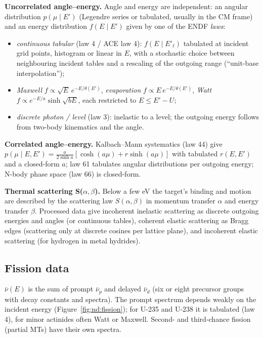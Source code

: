 \textbf{Uncorrelated angle--energy.} Angle and energy are independent: an angular distribution
$p(\mu\mid E')$ (Legendre series or tabulated, usually in the CM frame) and an energy distribution
$f(E\mid E')$ given by one of the ENDF \emph{laws}:
\begin{itemize}
\item \emph{continuous tabular} (law 4 / ACE law 4): $f(E\mid E'_\ell)$ tabulated at incident grid
  points, histogram or linear in $E$, with a stochastic choice between neighbouring incident tables and
  a rescaling of the outgoing range (``unit-base interpolation'');
\item \emph{Maxwell} $f\propto\sqrt E\,e^{-E/\theta(E')}$, \emph{evaporation}
  $f\propto E\,e^{-E/\theta(E')}$, \emph{Watt} $f\propto e^{-E/a}\sinh\sqrt{bE}$, each restricted to
  $E\le E'-U$;
\item \emph{discrete photon / level} (law 3): inelastic to a level; the outgoing energy follows from
  two-body kinematics and the angle.
\end{itemize}

\textbf{Correlated angle--energy.} Kalbach--Mann systematics (law 44) give
$p(\mu\mid E,E')=\frac{a}{2\sinh a}[\cosh(a\mu)+r\sinh(a\mu)]$ with tabulated $r(E,E')$ and a
closed-form $a$; law 61 tabulates angular distributions per outgoing energy; N-body phase space (law
66) is closed-form.

\textbf{Thermal scattering S($\alpha,\beta$).} Below a few eV the target's binding and motion are
described by the scattering law $S(\alpha,\beta)$ in momentum transfer $\alpha$ and energy transfer
$\beta$. Processed data give incoherent inelastic scattering as discrete outgoing energies and angles
(or continuous tables), coherent elastic scattering as Bragg edges (scattering only at discrete
cosines per lattice plane), and incoherent elastic scattering (for hydrogen in metal hydrides).

\subsection{Fission data}

$\bar\nu(E)$ is the sum of prompt $\bar\nu_p$ and delayed $\bar\nu_d$ (six or eight precursor groups
with decay constants and spectra). The prompt spectrum depends weakly on the incident energy
(Figure~\ref{fig:nd:fission}); for U-235 and U-238 it is tabulated (law 4), for minor actinides often
Watt or Maxwell. Second- and third-chance fission (partial MTs) have their own spectra.

